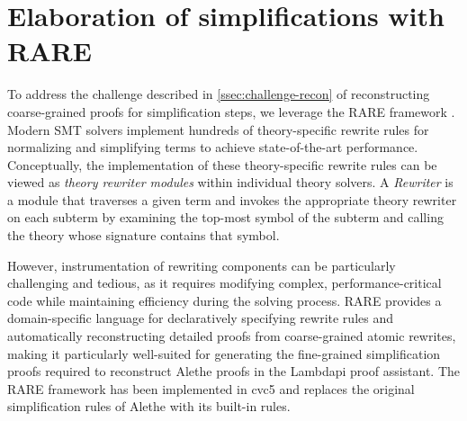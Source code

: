\section{Elaboration of simplifications with RARE}
\label{ssec:rare-intro}

To address the challenge described in \cref{ssec:challenge-recon} of reconstructing coarse-grained proofs for simplification steps, we leverage the RARE framework \cite{rare}.
Modern SMT solvers implement hundreds of theory-specific rewrite rules for normalizing and simplifying terms to achieve state-of-the-art performance.
Conceptually, the implementation of these theory-specific rewrite rules can be viewed as \emph{theory rewriter modules} within individual theory solvers.
A \emph{Rewriter} is a module that traverses a given term and invokes the appropriate theory rewriter on each subterm by examining the top-most symbol of the subterm and calling the theory whose signature contains that symbol.

However, instrumentation of rewriting components can be particularly challenging and tedious, as it requires modifying complex, performance-critical code while maintaining efficiency during the solving process.
RARE provides a domain-specific language for declaratively specifying rewrite rules and automatically reconstructing detailed proofs from coarse-grained atomic rewrites, making it particularly well-suited for generating the fine-grained simplification proofs required to reconstruct Alethe proofs in the Lambdapi proof assistant.
The RARE framework has been implemented in cvc5 and replaces the original simplification rules of Alethe with its built-in rules.


